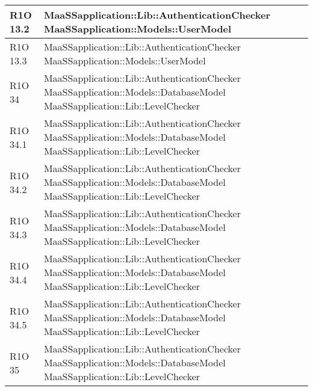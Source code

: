 \begin{center}
\begin{longtable}{ | l | p{8cm} |}
	R1O 13.2 & MaaSSapplication::Lib::AuthenticationChecker \newline MaaSSapplication::Models::UserModel  \newline  \\ \hline
	
	R1O 13.3 & MaaSSapplication::Lib::AuthenticationChecker \newline MaaSSapplication::Models::UserModel  \\ \hline
    
    R1O 34 & MaaSSapplication::Lib::AuthenticationChecker \newline  MaaSSapplication::Models::DatabaseModel \newline MaaSSapplication::Lib::LevelChecker \\ \hline
      	
   	R1O 34.1 & MaaSSapplication::Lib::AuthenticationChecker \newline  MaaSSapplication::Models::DatabaseModel \newline MaaSSapplication::Lib::LevelChecker \\ \hline
   	
   	R1O 34.2 & MaaSSapplication::Lib::AuthenticationChecker \newline  MaaSSapplication::Models::DatabaseModel \newline MaaSSapplication::Lib::LevelChecker \\ \hline
   	
   	R1O 34.3 & MaaSSapplication::Lib::AuthenticationChecker \newline  MaaSSapplication::Models::DatabaseModel \newline MaaSSapplication::Lib::LevelChecker \\ \hline
     	
    R1O 34.4 & MaaSSapplication::Lib::AuthenticationChecker \newline  MaaSSapplication::Models::DatabaseModel \newline MaaSSapplication::Lib::LevelChecker \\ \hline
    
    R1O 34.5 & MaaSSapplication::Lib::AuthenticationChecker \newline  MaaSSapplication::Models::DatabaseModel \newline MaaSSapplication::Lib::LevelChecker \\ \hline
    
    R1O 35 & MaaSSapplication::Lib::AuthenticationChecker \newline  MaaSSapplication::Models::DatabaseModel \newline MaaSSapplication::Lib::LevelChecker \\ \hline
    

\end{longtable}
\end{center}
